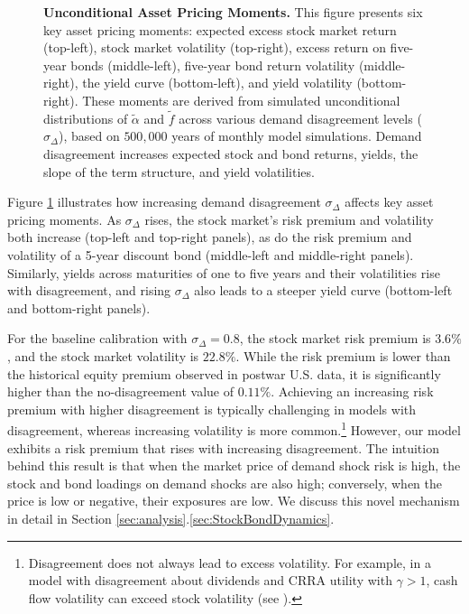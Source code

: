 \documentclass[preprint,11pt,authoryear]{elsarticle}
\theoremstyle{plain}
\begin{document}
\begin{figure}[htbp]
\begin{tabular}{cc}
\end{tabular}
\caption{\textbf{Unconditional Asset Pricing Moments.} \footnotesize{This figure presents six key asset pricing moments: expected excess stock market return (top-left), stock market volatility (top-right), excess return on five-year bonds (middle-left), five-year bond return volatility (middle-right), the yield curve (bottom-left), and yield volatility (bottom-right). These moments are derived from simulated unconditional distributions of $\tilde{\alpha}$ and $\tilde{f}$ across various demand disagreement levels ($\sigma_{\Delta}$), based on $500,000$ years of monthly model simulations. Demand disagreement increases expected stock and bond returns, yields, the slope of the term structure, and yield volatilities.}}  \label{fig:UnconditionalAP} 
\end{figure}
Figure \ref{fig:UnconditionalAP} illustrates how increasing demand disagreement \( \sigma_{\Delta}\) affects key asset pricing moments. As \( \sigma_{\Delta}\) rises, the stock market's risk premium and volatility both increase (top-left and top-right panels), as do the risk premium and volatility of a 5-year discount bond (middle-left and middle-right panels). Similarly, yields across maturities of one to five years and their volatilities rise with disagreement, and rising $\sigma_{\Delta}$ also leads to a steeper yield curve (bottom-left and bottom-right panels).

For the baseline calibration with \( \sigma_{\Delta}= 0.8 \), the stock market risk premium is \( 3.6\% \), and the stock market volatility is \( 22.8\% \). While the risk premium is lower than the historical equity premium observed in postwar U.S. data, it is significantly higher than the no-disagreement value of \( 0.11\% \). Achieving an increasing risk premium with higher disagreement is typically challenging in models with disagreement, whereas increasing volatility is more common.\footnote{Disagreement does not always lead to excess volatility. For example, in a model with disagreement about dividends and CRRA utility with \(\gamma > 1\), cash flow volatility can exceed stock volatility (see \cite{}).}  However, our model  exhibits a risk premium that rises with increasing disagreement. The intuition behind this result is that when the market price of demand shock risk is high, the stock and bond loadings on demand shocks are also high; conversely, when the price is low or negative, their exposures are low.  We discuss this novel mechanism in detail in Section \ref{sec:analysis}.\ref{sec:StockBondDynamics}.
\end{document}
